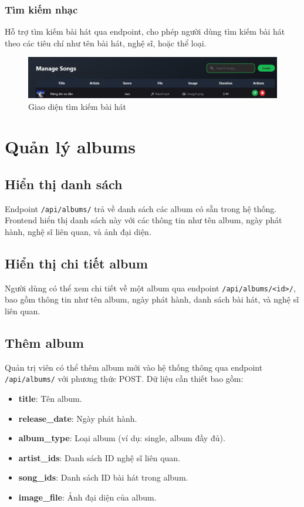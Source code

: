 \subsubsection{Tìm kiếm nhạc}
Hỗ trợ tìm kiếm bài hát qua endpoint, cho phép người dùng tìm kiếm bài hát theo các tiêu chí như tên bài hát, nghệ sĩ, hoặc thể loại.

\begin{figure}[H]
    \centering
    \includegraphics[width=1\textwidth]{imgs/frontend-search-song.jpg}
    \caption{Giao diện tìm kiếm bài hát}
\end{figure}

\section{Quản lý albums}
\subsection{Hiển thị danh sách}
Endpoint \texttt{/api/albums/} trả về danh sách các album có sẵn trong hệ thống. Frontend hiển thị danh sách này với các thông tin như tên album, ngày phát hành, nghệ sĩ liên quan, và ảnh đại diện.

\subsection{Hiển thị chi tiết album}
Người dùng có thể xem chi tiết về một album qua endpoint \texttt{/api/albums/<id>/}, bao gồm thông tin như tên album, ngày phát hành, danh sách bài hát, và nghệ sĩ liên quan.

\subsection{Thêm album}
Quản trị viên có thể thêm album mới vào hệ thống thông qua endpoint \texttt{/api/albums/} với phương thức POST. Dữ liệu cần thiết bao gồm:
\begin{itemize}
    \item \textbf{title}: Tên album.
    \item \textbf{release\_date}: Ngày phát hành.
    \item \textbf{album\_type}: Loại album (ví dụ: single, album đầy đủ).
    \item \textbf{artist\_ids}: Danh sách ID nghệ sĩ liên quan.
    \item \textbf{song\_ids}: Danh sách ID bài hát trong album.
    \item \textbf{image\_file}: Ảnh đại diện của album.
\end{itemize}

